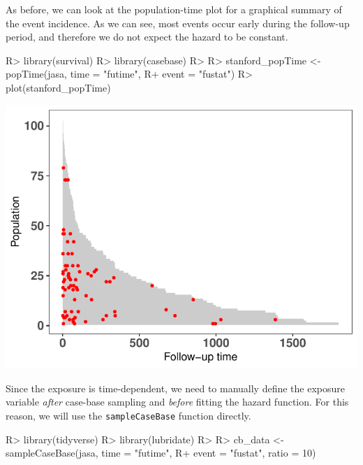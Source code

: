 \documentclass[
]{jss}
\begin{document}
As before, we can look at the population-time plot for a graphical
summary of the event incidence. As we can see, most events occur early
during the follow-up period, and therefore we do not expect the hazard
to be constant.

\begin{CodeChunk}

\begin{CodeInput}
R> library(survival)
R> library(casebase)
R> 
R> stanford_popTime <- popTime(jasa, time = "futime", 
R+                             event = "fustat")
R> plot(stanford_popTime)
\end{CodeInput}


\begin{center}\includegraphics{../figures/stanford-poptime-1} \end{center}

\end{CodeChunk}

Since the exposure is time-dependent, we need to manually define the
exposure variable \emph{after} case-base sampling and \emph{before}
fitting the hazard function. For this reason, we will use the
\texttt{sampleCaseBase} function directly.

\begin{CodeChunk}

\begin{CodeInput}
R> library(tidyverse)
R> library(lubridate)
R> 
R> cb_data <- sampleCaseBase(jasa, time = "futime", 
R+                           event = "fustat", ratio = 10)
\end{CodeInput}
\end{CodeChunk}
\end{document}
